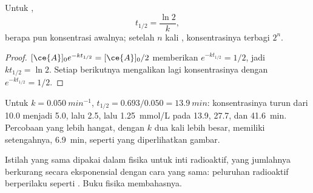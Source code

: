 \begin{proposition}\label{prop:g12:reaction-rates:half-life}
Untuk ,
\[
  t_{1/2} = \frac{\ln 2}{k},
\]
berapa pun konsentrasi awalnya; setelah $n$ kali ,
konsentrasinya terbagi $2^n$.
\end{proposition}

\begin{proof}
$[\ce{A}]_0 e^{-k t_{1/2}} = [\ce{A}]_0 / 2$ memberikan
$e^{-k t_{1/2}} = 1/2$, jadi $k t_{1/2} = \ln 2$. Setiap 
berikutnya mengalikan lagi konsentrasinya dengan $e^{-k t_{1/2}} = 1/2$.
\end{proof}


\begin{example}\label{ex:g12:reaction-rates:half-lives}
Untuk $k = \qty{0.050}{min^{-1}}$, $t_{1/2} = 0.693 / 0.050 =
\qty{13.9}{min}$: konsentrasinya turun dari 10.0 menjadi 5.0, lalu 2.5,
lalu \qty{1.25}{mmol/L} pada 13.9, 27.7, dan \qty{41.6}{min}. Percobaan
yang lebih hangat, dengan $k$ dua kali lebih besar, memiliki 
setengahnya, \qty{6.9}{min}, seperti yang diperlihatkan gambar.
\end{example}

\begin{remark}\label{rem:g12:reaction-rates:radioactive}
Istilah yang sama dipakai dalam fisika untuk inti radioaktif, yang
jumlahnya berkurang secara eksponensial dengan cara yang sama: peluruhan
radioaktif berperilaku seperti . Buku fisika
membahasnya.
\end{remark}

